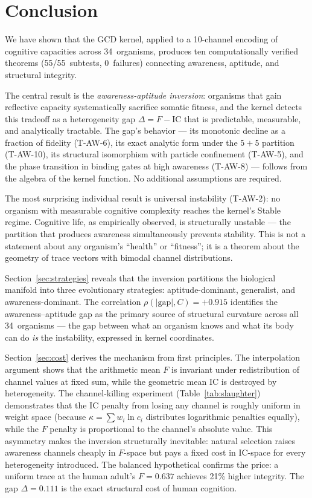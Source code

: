 \documentclass[
  aps,
  prd,
  twocolumn,
  superscriptaddress,
  nofootinbib,
  floatfix
]{revtex4-2}
\newcommand{\IC}{\mathrm{IC}}
\begin{document}
\section{Conclusion}\label{sec:conclusion}

We have shown that the GCD kernel, applied to a 10-channel
encoding of cognitive capacities across 34~organisms, produces
ten computationally verified theorems (55/55~subtests,
0~failures) connecting awareness, aptitude, and structural
integrity.

The central result is the \emph{awareness-aptitude inversion}:
organisms that gain reflective capacity systematically
sacrifice somatic fitness, and the kernel detects this tradeoff
as a heterogeneity gap $\Delta = F - \IC$ that is
predictable, measurable, and analytically tractable.  The
gap's behavior --- its monotonic decline as a fraction of
fidelity (T-AW-6), its exact analytic form under the $5\!+\!5$
partition (T-AW-10), its structural isomorphism with particle
confinement (T-AW-5), and the phase transition in binding
gates at high awareness (T-AW-8) --- follows from the
algebra of the kernel function.  No additional assumptions
are required.

The most surprising individual result is universal
instability (T-AW-2): no organism with measurable cognitive
complexity reaches the kernel's Stable regime.  Cognitive
life, as empirically observed, is structurally unstable ---
the partition that produces awareness simultaneously prevents
stability.  This is not a statement about any organism's
``health'' or ``fitness''; it is a theorem about the geometry
of trace vectors with bimodal channel distributions.

Section~\ref{sec:strategies} reveals that the inversion
partitions the biological manifold into three evolutionary
strategies: aptitude-dominant, generalist, and
awareness-dominant.  The correlation $\rho(|\mathrm{gap}|,
C) = +0.915$ identifies the awareness--aptitude gap as the
primary source of structural curvature across all 34~organisms
--- the gap between what an organism knows and what its body
can do \emph{is} the instability, expressed in kernel
coordinates.

Section~\ref{sec:cost} derives the mechanism from first
principles.  The interpolation argument shows that the
arithmetic mean $F$ is invariant under redistribution of
channel values at fixed sum, while the geometric mean $\IC$
is destroyed by heterogeneity.  The channel-killing experiment
(Table~\ref{tab:slaughter}) demonstrates that the $\IC$
penalty from losing any channel is roughly uniform in
weight space (because $\kappa = \sum w_i \ln c_i$
distributes logarithmic penalties equally), while the $F$
penalty is proportional to the channel's absolute value.
This asymmetry makes the inversion structurally
inevitable: natural selection raises awareness channels
cheaply in $F$-space but pays a fixed cost in $\IC$-space
for every heterogeneity introduced.  The balanced
hypothetical confirms the price: a uniform trace at the
human adult's $F = 0.637$ achieves 21\% higher integrity.
The gap $\Delta = 0.111$ is the exact structural cost of
human cognition.
\end{document}
